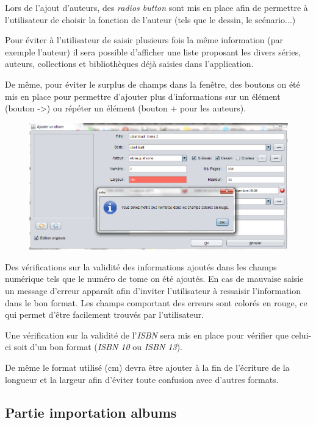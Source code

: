 \documentclass[etudiants]{support-iutrs}
\begin{document}
Lors de l'ajout d'auteurs, des \emph{radios button} sont mis en place afin de permettre à l'utilisateur de choisir la fonction de l'auteur (tels que le dessin, le scénario...)

Pour éviter à l'utilisateur de saisir plusieurs fois la même information (par exemple l'auteur) il sera possible d'afficher une liste proposant les divers séries, auteurs, collections et bibliothèques déjà saisies dans l'application.

De même, pour éviter le surplus de champs dans la fenêtre, des boutons on été mis en place pour permettre d'ajouter plus d'informations sur un élément (bouton ->) ou répéter un élément (bouton + pour les auteurs).

\begin{figure}[h!]
\begin{center}
\includegraphics[width=12cm]{img/app_pc_maquette_erreur.png}
\end{center}
\end{figure}

Des vérifications sur la validité des informations ajoutés dans les champs numérique tels que le numéro de tome on été ajoutés. 
En cas de mauvaise saisie un message d'erreur apparaît afin d'inviter l'utilisateur à ressaisir l'information dans le bon format.
Les champs comportant des erreurs sont colorés en rouge, ce qui permet d'être facilement trouvés par l'utilisateur. 

Une vérification sur la validité de l'\emph{ISBN} sera mis en place pour vérifier que celui-ci soit d'un bon format (\emph{ISBN 10} ou \emph{ISBN 13}).

De même le format utilisé (cm) devra être ajouter à la fin de l'écriture de la longueur et la largeur afin d'éviter toute confusion avec d'autres formats.    
\clearpage

\subsection{Partie importation albums}
\end{document}
